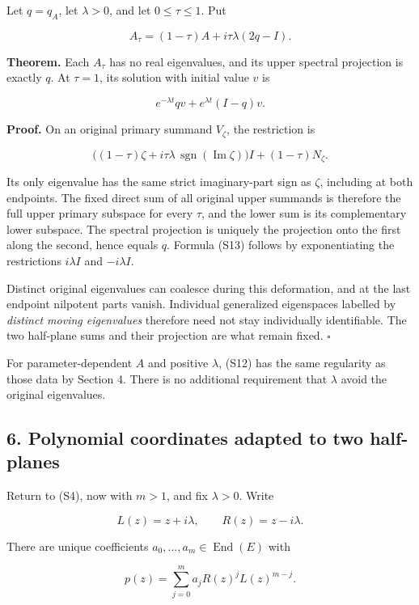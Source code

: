 \documentclass[
  11pt,
]{article}
\begin{document}
Let \(q=q_A\), let \(\lambda>0\), and let \(0\leq\tau\leq1\). Put

\[
A_\tau=(1-\tau)A+i\tau\lambda(2q-I).                      \tag{S12}
\]

\textbf{Theorem.} Each \(A_\tau\) has no real eigenvalues, and its upper
spectral projection is exactly \(q\). At \(\tau=1\), its solution with
initial value \(v\) is

\[
e^{-\lambda t}qv+e^{\lambda t}(I-q)v.                     \tag{S13}
\]

\textbf{Proof.} On an original primary summand \(V_\zeta\), the
restriction is

\[
\big((1-\tau)\zeta+i\tau\lambda\,
\operatorname{sgn}(\operatorname{Im}\zeta)\big)I
+(1-\tau)N_\zeta.
\]

Its only eigenvalue has the same strict imaginary-part sign as
\(\zeta\), including at both endpoints. The fixed direct sum of all
original upper summands is therefore the full upper primary subspace for
every \(\tau\), and the lower sum is its complementary lower subspace.
The spectral projection is uniquely the projection onto the first along
the second, hence equals \(q\). Formula (S13) follows by exponentiating
the restrictions \(i\lambda I\) and \(-i\lambda I\).

Distinct original eigenvalues can coalesce during this deformation, and
at the last endpoint nilpotent parts vanish. Individual generalized
eigenspaces labelled by \emph{distinct moving eigenvalues} therefore
need not stay individually identifiable. The two half-plane sums and
their projection are what remain fixed. \(\square\)

For parameter-dependent \(A\) and positive \(\lambda\), (S12) has the
same regularity as those data by Section 4. There is no additional
requirement that \(\lambda\) avoid the original eigenvalues.

\subsection{6. Polynomial coordinates adapted to two
half-planes}\label{polynomial-coordinates-adapted-to-two-half-planes}

Return to (S4), now with \(m>1\), and fix \(\lambda>0\). Write

\[
L(z)=z+i\lambda,\qquad R(z)=z-i\lambda.
\]

There are unique coefficients \(a_0,\ldots,a_m\in\operatorname{End}(E)\)
with

\[
p(z)=\sum_{j=0}^m a_j R(z)^jL(z)^{m-j}.                   \tag{S14}
\]
\end{document}
